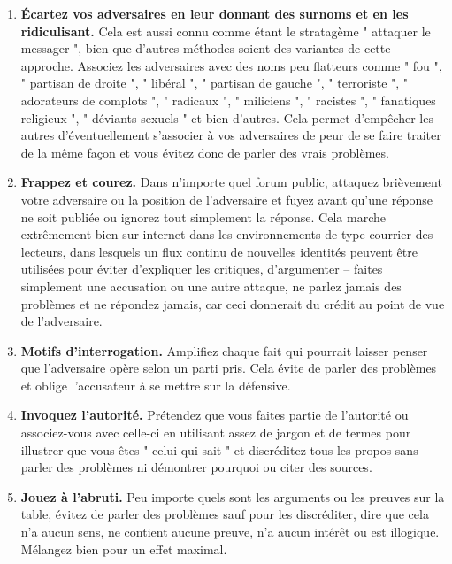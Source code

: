 \documentclass[11pt,twoside,a4paper]{article}
\begin{document}
\begin{enumerate}
	\item \textbf{{\'E}cartez vos adversaires en leur donnant des surnoms et en les ridiculisant. } Cela est aussi connu comme {\'e}tant le stratag{\`e}me " attaquer le messager ", bien que d'autres m{\'e}thodes soient des variantes de cette approche. Associez les adversaires avec des noms peu flatteurs comme " fou ", " partisan de droite ", " lib{\'e}ral ", " partisan de gauche ", " terroriste ", " adorateurs de complots ", " radicaux ", " miliciens ", " racistes ", " fanatiques religieux ", " d{\'e}viants sexuels " et bien d'autres. Cela permet d'emp{\^e}cher les autres d'{\'e}ventuellement s'associer {\`a} vos adversaires de peur de se faire traiter de la m{\^e}me fa\c{c}on et vous {\'e}vitez donc de parler des vrais probl{\`e}mes.
	\item \textbf{Frappez et courez. } Dans n'importe quel forum public, attaquez bri{\`e}vement votre adversaire ou la position de l'adversaire et fuyez avant qu'une r{\'e}ponse ne soit publi{\'e}e ou ignorez tout simplement la r{\'e}ponse. Cela marche extr{\^e}mement bien sur internet dans les environnements de type courrier des lecteurs, dans lesquels un flux continu de nouvelles identit{\'e}s peuvent {\^e}tre utilis{\'e}es pour {\'e}viter d'expliquer les critiques, d'argumenter -- faites simplement une accusation ou une autre attaque, ne parlez jamais des probl{\`e}mes et ne r{\'e}pondez jamais, car ceci donnerait du cr{\'e}dit au point de vue de l'adversaire.
	\item \textbf{Motifs d'interrogation. } Amplifiez chaque fait qui pourrait laisser penser que l'adversaire op{\`e}re selon un parti pris. Cela {\'e}vite de parler des probl{\`e}mes et oblige l'accusateur {\`a} se mettre sur la d{\'e}fensive.
	\item \textbf{Invoquez l'autorit{\'e}. } Pr{\'e}tendez que vous faites partie de l'autorit{\'e} ou associez-vous avec celle-ci en utilisant assez de jargon et de termes pour illustrer que vous {\^e}tes " celui qui sait " et discr{\'e}ditez tous les propos sans parler des probl{\`e}mes ni d{\'e}montrer pourquoi ou citer des sources.
	\item \textbf{Jouez {\`a} l'abruti. } Peu importe quels sont les arguments ou les preuves sur la table, {\'e}vitez de parler des probl{\`e}mes sauf pour les discr{\'e}diter, dire que cela n'a aucun sens, ne contient aucune preuve, n'a aucun int{\'e}r{\^e}t ou est illogique. M{\'e}langez bien pour un effet maximal.

\end{enumerate}
\end{document}

